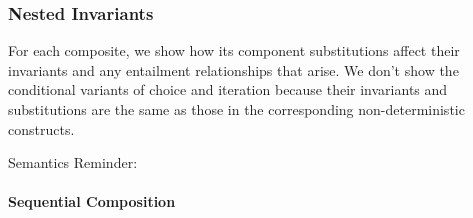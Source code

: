 \subsubsection{Nested Invariants}

For each composite,
we show how its component substitutions affect their invariants
and any entailment relationships that arise.
We don't show the conditional variants of choice and iteration
because their invariants and substitutions are the same as those
in the corresponding non-deterministic constructs.

Semantics Reminder:


\paragraph{Sequential Composition}

